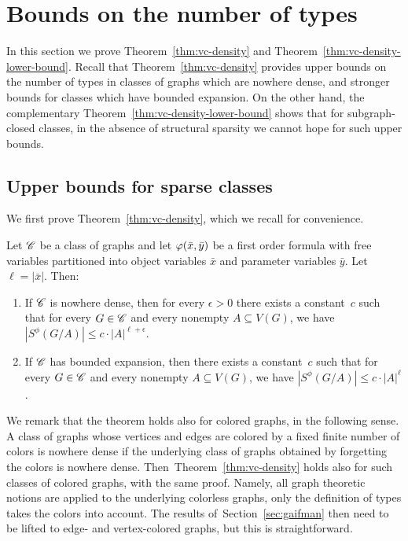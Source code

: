 \section{Bounds on the number of types}\label{sec:types}

In this section we prove Theorem~\ref{thm:vc-density} and Theorem~\ref{thm:vc-density-lower-bound}.
	Recall that Theorem~\ref{thm:vc-density} provides upper bounds on the number of types in classes of graphs which are nowhere dense, 
	and stronger bounds for classes which have bounded expansion. 
	On the other hand, the complementary Theorem~\ref{thm:vc-density-lower-bound} shows that for subgraph-closed classes, in the absence of structural sparsity we cannot hope for such upper bounds.

\subsection{Upper bounds for sparse classes}
We first prove Theorem~\ref{thm:vc-density}, which we recall for convenience.


 \setcounter{aux}{\value{theorem}}
 \setcounter{theorem}{\value{vcupper}}
 \setcounter{auxsec}{\value{section}}
 \setcounter{section}{1}
 \begin{theorem}\label{thm:vc-density-recall}
 Let $\mathscr{C}$ be a class of graphs and let $\varphi(\bar{x},\bar{y})$ be a first order formula
 with free variables  partitioned  into object variables $\bar x$  and parameter variables $\bar y$. Let $\ell=|\bar x|$. Then:
 \begin{enumerate}
 \item If $\mathscr{C}$ is nowhere dense, then for every $\epsilon>0$
 there exists a constant~$c$ such that for every $G\in \mathscr{C}$ and every nonempty
 $A\subseteq V(G)$, we have $|S^\phi(G/A)|\leq c\cdot |A|^{\ell+\epsilon}.$
 \item If $\mathscr{C}$ has bounded expansion, then there exists a constant~$c$ such that for every $G\in \mathscr{C}$ and every nonempty $A\subseteq V(G)$, we have $|S^\phi(G/A)|\leq c\cdot |A|^\ell$.
 \end{enumerate}
 \end{theorem}
 \setcounter{theorem}{\theaux}
  \setcounter{section}{\value{auxsec}}
We remark that the theorem holds also for colored graphs, in the following sense.
A class of graphs  whose vertices and edges are colored by a fixed finite number of colors is nowhere dense if the underlying class of graphs obtained by forgetting the colors is nowhere dense. 
Then~Theorem~\ref{thm:vc-density} holds also for such classes of colored graphs, with the same proof. Namely, all graph theoretic notions
are applied to the underlying colorless graphs, only the definition of types takes the colors into account. 
The results of~Section~\ref{sec:gaifman} then need to be lifted to edge- and vertex-colored graphs, but this is straightforward.

